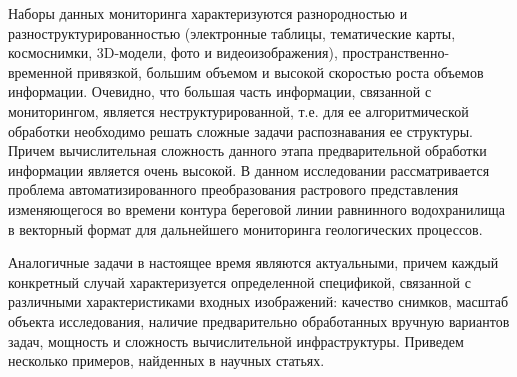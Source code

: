 \documentclass[732,fontsize=14pt,final]{studrep}
\begin{document}
Наборы данных мониторинга характеризуются разнородностью и разноструктурированностью (электронные таблицы, тематические карты, космоснимки, 3D-модели, фото и видеоизображения), пространственно-временной привязкой, большим объемом и высокой скоростью роста объемов информации. Очевидно, что большая часть информации, связанной с мониторингом, является неструктурированной, т.е. для ее алгоритмической обработки необходимо решать сложные задачи распознавания ее структуры. Причем вычислительная сложность данного этапа предварительной обработки информации является очень высокой.  В данном исследовании рассматривается проблема автоматизированного преобразования растрового представления изменяющегося во времени контура береговой линии равнинного водохранилища в векторный формат для дальнейшего мониторинга геологических процессов.

Аналогичные задачи в настоящее время являются актуальными, причем каждый конкретный случай характеризуется определенной спецификой, связанной с различными характеристиками входных изображений: качество снимков, масштаб объекта исследования, наличие предварительно обработанных вручную вариантов задач, мощность и сложность вычислительной инфраструктуры. Приведем несколько примеров, найденных в научных статьях. 
\end{document}
